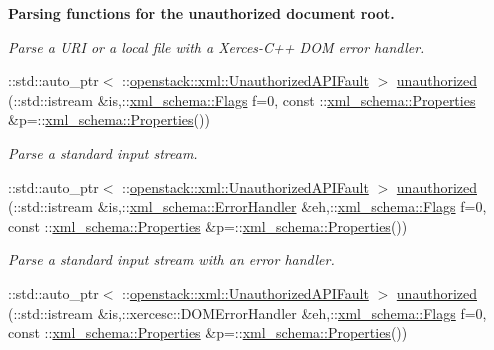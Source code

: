\begin{Indent}{\bf Parsing functions for the unauthorized document root.}
\begin{DoxyCompactItemize}
\begin{DoxyCompactList}\small\item\em Parse a URI or a local file with a Xerces-\/C++ DOM error handler. \item\end{DoxyCompactList}\item 
::std::auto\_\-ptr$<$ ::\hyperlink{classopenstack_1_1xml_1_1UnauthorizedAPIFault}{openstack::xml::UnauthorizedAPIFault} $>$ \hyperlink{namespaceopenstack_1_1xml_af632d753ca5fc8da37568aa38f0f7465}{unauthorized} (::std::istream \&is,::\hyperlink{namespacexml__schema_affb4c227cbd9aa7453dd1dc5a1401943}{xml\_\-schema::Flags} f=0, const ::\hyperlink{namespacexml__schema_ad27ce19a7ee1d3b1064092648898f64c}{xml\_\-schema::Properties} \&p=::\hyperlink{namespacexml__schema_ad27ce19a7ee1d3b1064092648898f64c}{xml\_\-schema::Properties}())
\begin{DoxyCompactList}\small\item\em Parse a standard input stream. \item\end{DoxyCompactList}\item 
::std::auto\_\-ptr$<$ ::\hyperlink{classopenstack_1_1xml_1_1UnauthorizedAPIFault}{openstack::xml::UnauthorizedAPIFault} $>$ \hyperlink{namespaceopenstack_1_1xml_ad3fcfc7196d4ca460cc1abccd22d9bf5}{unauthorized} (::std::istream \&is,::\hyperlink{namespacexml__schema_ab1c9361bfd3b404eaabf0c31eded79dc}{xml\_\-schema::ErrorHandler} \&eh,::\hyperlink{namespacexml__schema_affb4c227cbd9aa7453dd1dc5a1401943}{xml\_\-schema::Flags} f=0, const ::\hyperlink{namespacexml__schema_ad27ce19a7ee1d3b1064092648898f64c}{xml\_\-schema::Properties} \&p=::\hyperlink{namespacexml__schema_ad27ce19a7ee1d3b1064092648898f64c}{xml\_\-schema::Properties}())
\begin{DoxyCompactList}\small\item\em Parse a standard input stream with an error handler. \item\end{DoxyCompactList}\item 
::std::auto\_\-ptr$<$ ::\hyperlink{classopenstack_1_1xml_1_1UnauthorizedAPIFault}{openstack::xml::UnauthorizedAPIFault} $>$ \hyperlink{namespaceopenstack_1_1xml_af7f0381ca0c8ab415c1ad24c4a91c0eb}{unauthorized} (::std::istream \&is,::xercesc::DOMErrorHandler \&eh,::\hyperlink{namespacexml__schema_affb4c227cbd9aa7453dd1dc5a1401943}{xml\_\-schema::Flags} f=0, const ::\hyperlink{namespacexml__schema_ad27ce19a7ee1d3b1064092648898f64c}{xml\_\-schema::Properties} \&p=::\hyperlink{namespacexml__schema_ad27ce19a7ee1d3b1064092648898f64c}{xml\_\-schema::Properties}())

\end{DoxyCompactItemize}
\end{Indent}
